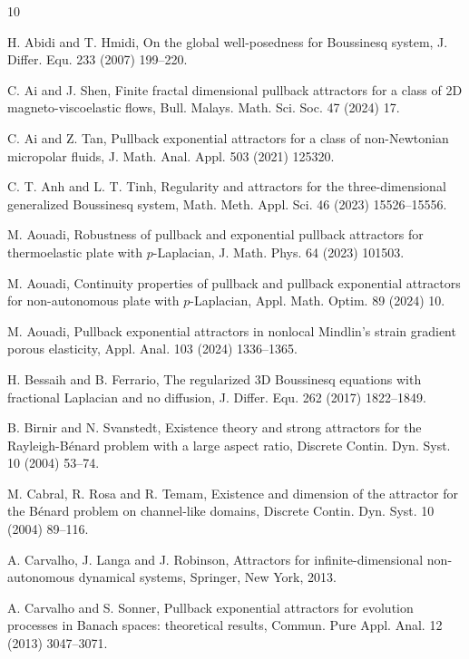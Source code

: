 \documentclass[oneside,preprint,12pt,numbers,sort&compress]{elsarticle}
\begin{document}
\begin{thebibliography}{10}

H. Abidi and T. Hmidi, On the global well-posedness for Boussinesq system, J. Differ. Equ. 233 (2007) 199--220.%

C. Ai and J. Shen, Finite fractal dimensional pullback attractors for a class of 2D magneto-viscoelastic flows, Bull. Malays. Math. Sci. Soc. 47 (2024) 17.%

C. Ai and Z. Tan, Pullback exponential attractors for a class of non-Newtonian micropolar fluids, J. Math. Anal. Appl. 503 (2021) 125320. %

C. T. Anh and L. T. Tinh, Regularity and attractors for the three-dimensional generalized Boussinesq system, Math. Meth. Appl. Sci. 46 (2023) 15526–15556. %



M. Aouadi, Robustness of pullback and exponential pullback attractors for thermoelastic plate with $p$-Laplacian, J. Math. Phys. 64 (2023) 101503.   %

M. Aouadi, Continuity properties of pullback and pullback exponential attractors for non-autonomous plate with $p$-Laplacian, Appl. Math. Optim. 89 (2024) 10.  %

M. Aouadi, Pullback exponential attractors in nonlocal Mindlin's strain gradient porous elasticity, Appl. Anal. 103 (2024) 1336--1365. %


H. Bessaih and B. Ferrario, The regularized 3D Boussinesq equations with fractional Laplacian and no diffusion, J. Differ. Equ. 262 (2017) 1822--1849.%

B. Birnir and N. Svanstedt, Existence theory and strong attractors for the Rayleigh-B\'enard problem with a large aspect ratio, Discrete Contin. Dyn. Syst. 10 (2004) 53--74.%

M. Cabral, R. Rosa and R. Temam, Existence and dimension of the attractor for the B\'enard problem on channel-like domains, Discrete Contin. Dyn. Syst. 10 (2004) 89--116.%

A. Carvalho, J. Langa and J. Robinson, Attractors for infinite-dimensional non-autonomous dynamical systems, Springer, New York, 2013. %

A. Carvalho and S. Sonner, Pullback exponential attractors for evolution processes in Banach spaces: theoretical results, Commun. Pure Appl. Anal. 12 (2013) 3047--3071.%


\end{thebibliography}
\end{document}
